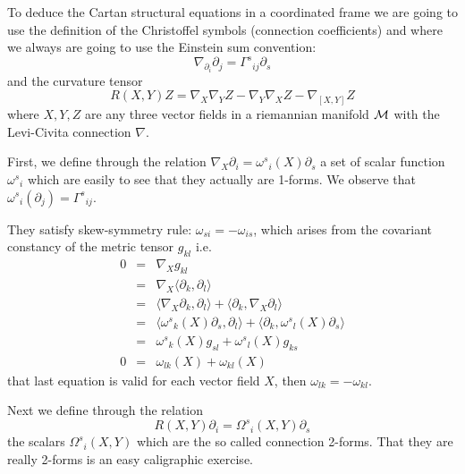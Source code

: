 \documentclass[12pt]{article}
\begin{document}
To deduce the Cartan structural equations in a coordinated frame we are going to use the definition of the Christoffel symbols (connection coefficients) and where we always are going to use the Einstein sum convention:
$$\nabla_{\partial_ i}\partial_j={\Gamma^s}_{ij}\partial_s$$
and the curvature tensor 
$$R(X,Y)Z=\nabla_X\nabla_YZ-\nabla_Y\nabla_XZ-\nabla_{[X,Y]}Z$$
where $X,Y,Z$ are any three vector fields in a riemannian manifold $\cal{M}$ with the Levi-Civita connection $\nabla$. 

First, we define through the relation $\nabla_X\partial_i={\omega^s}_i(X)\partial_s$ a set of scalar function ${\omega^s}_i$ which are easily to see that they actually are 1-forms. We observe that ${\omega^s}_i(\partial_j)={\Gamma^s}_{ij}$.

They satisfy skew-symmetry rule: $\omega_{si}=-\omega_{is}$,
which arises from the covariant constancy of the metric tensor $g_{kl}$ i.e. 
\begin{eqnarray*}
0&=&\nabla_{X}g_{kl}\\
 &=&\nabla_{X}\langle\partial_k,\partial_l\rangle\\
 &=&\langle\nabla_{X}\partial_k,\partial_l\rangle+\langle\partial_k,\nabla_{X}\partial_l\rangle\\
 &=&\langle{\omega^s}_k(X)\partial_s,\partial_l\rangle+\langle\partial_k,{\omega^s}_l(X)\partial_s\rangle\\
 &=&{\omega^s}_k(X)g_{sl}+{\omega^s}_l(X)g_{ks}\\
0&=&\omega_{lk}(X)+\omega_{kl}(X)
\end{eqnarray*}
that last equation is valid for each vector field $X$, then $\omega_{lk}=-\omega_{kl}$.

Next we define through the relation
$$R(X,Y)\partial_i={\Omega^s}_i(X,Y)\partial_s$$
the scalars ${\Omega^s}_i(X,Y)$ which are the so called connection 2-forms.
That they are really 2-forms is an easy caligraphic exercise.
\end{document}
